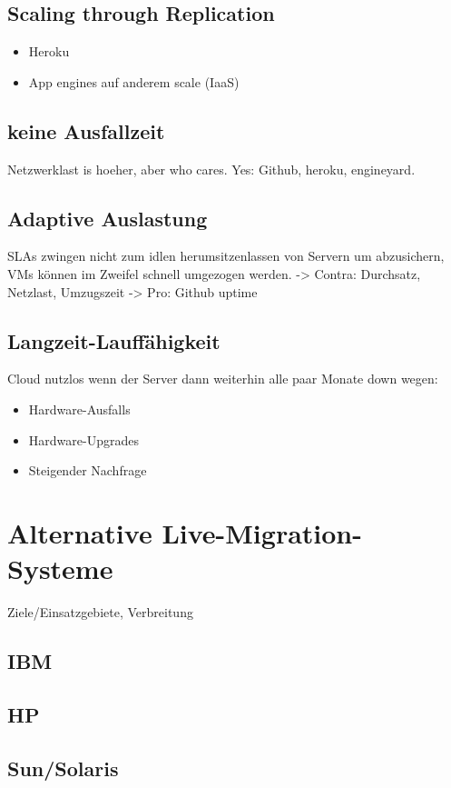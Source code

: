 \documentclass[draft,journal]{IEEEtran}
\begin{document}
\subsection{Scaling through Replication}
\label{sec:replication}
\begin{itemize}
\item Heroku
\item App engines auf anderem scale (IaaS)
\end{itemize}
\subsection{keine Ausfallzeit}
\label{sec:keine-ausfallzeit}
Netzwerklast is hoeher, aber who cares.
Yes: Github, heroku, engineyard.
\subsection{Adaptive Auslastung}
\label{sec:adaptive-auslastung}
SLAs zwingen nicht zum idlen herumsitzenlassen von Servern um
abzusichern, VMs können im Zweifel schnell umgezogen werden.
-> Contra: Durchsatz, Netzlast, Umzugszeit
-> Pro: Github uptime
\subsection{Langzeit-Lauffähigkeit}
\label{sec:langz-lauff}
Cloud nutzlos wenn der Server dann weiterhin alle paar Monate down
wegen:
\begin{itemize}
\item Hardware-Ausfalls
\item Hardware-Upgrades
\item Steigender Nachfrage
\end{itemize}

\section{Alternative Live-Migration-Systeme}
Ziele/Einsatzgebiete, Verbreitung

\subsection{IBM}
\subsection{HP}
\subsection{Sun/Solaris}
\end{document}
